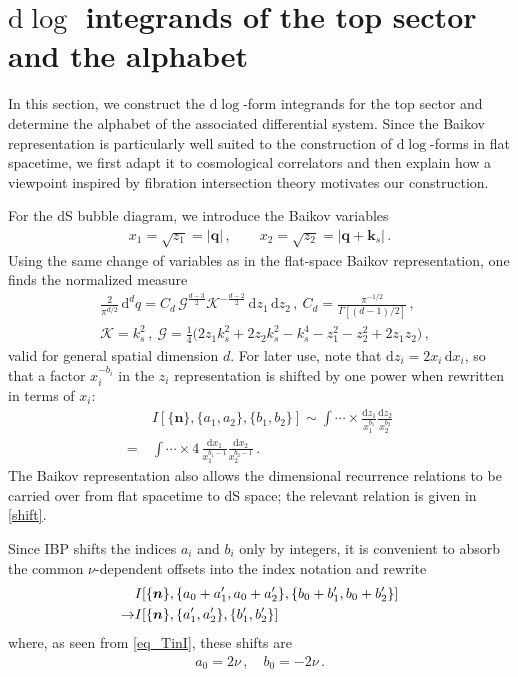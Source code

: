\documentclass[%
 reprint,
 amsmath,amssymb,
 aps,
prd,
]{revtex4-2}
\newcommand{\n}{\nonumber}
\def\ie{\begin{equation}\begin{aligned}}
\def\fe{\end{aligned}\end{equation}}
\def\di{{\mathrm{d}}}
\def\mb{\mathbf}
\newcommand{\mG}{\mathcal{G}}
\newcommand{\mK}{\mathcal{K}}
\def\to{\rightarrow}
\begin{document}
\section{\(\di\log\) integrands of the top sector and the alphabet}
\label{sec:baikov}

In this section, we construct the \(\di\log\)-form integrands for the top sector and determine the alphabet of the associated differential system. Since the Baikov representation is particularly well suited to the construction of \(\di\log\)-forms in flat spacetime, we first adapt it to cosmological correlators and then explain how a viewpoint inspired by fibration intersection theory motivates our construction.

For the dS bubble diagram, we introduce the Baikov variables \cite{Baikov:1996iu}
\begin{align}
x_1=\sqrt{z_1}=|\mb q|\,,\qquad x_2=\sqrt{z_2}=|\mb q+\mb k_s|\,.
\end{align}
Using the same change of variables as in the flat-space Baikov representation, one finds the normalized measure
\ie
&\frac{2}{\pi^{d/2}}\,\di^d q
= C_d\,\mG^{\frac{d-3}{2}}\mK^{-\frac{d-2}{2}}\,\di z_1\,\di z_2\,,\ 
C_{d} = \frac{\pi^{-1/2}}{\Gamma[(d-1)/2]}\,, \\
&\mK=k_s^2\,, \ 
\mG=\frac{1}{4}\Big(2 z_1 k_s^2+2 z_2 k_s^2-k_s^4-z_1^2-z_2^2+2 z_1 z_2\Big)\,,
\fe
valid for general spatial dimension \(d\). For later use, note that \(\di z_i=2x_i\,\di x_i\), so that a factor \(x_i^{-b_i}\) in the \(z_i\) representation is shifted by one power when rewritten in terms of \(x_i\):
\begin{align}
&~I[\{\bm{n}\},\{a_1,a_2\},\{b_1,b_2\}]
\sim
\int \cdots \times \frac{\di z_1}{x_1^{b_1}}\frac{\di z_2}{x_2^{b_2}}\n\\
=&~
\int \cdots \times 4\,\frac{\di x_1}{x_1^{b_1-1}}\frac{\di x_2}{x_2^{b_2-1}}\,.
\end{align}
The Baikov representation also allows the dimensional recurrence relations \cite{Tarasov:1996br,Lee:2010wea} to be carried over from flat spacetime to dS space; the relevant relation is given in \eqref{shift}.

Since IBP shifts the indices \(a_i\) and \(b_i\) only by integers, it is convenient to absorb the common \(\nu\)-dependent offsets into the index notation and rewrite
\begin{align}
	&I[\{\bm{n}\},\{a_0+a_1',a_0+a_2'\},\{b_0+b_1',b_0+b_2'\}]\notag\\
	\to &I[\{\bm{n}\},\{a_1',a_2'\},\{b_1',b_2'\}]
\end{align}
where, as seen from \eqref{eq_TinI}, these shifts are
\begin{align}
	a_0 = 2\nu  \,, \quad b_0= -2\nu \,.
\end{align}
\end{document}
